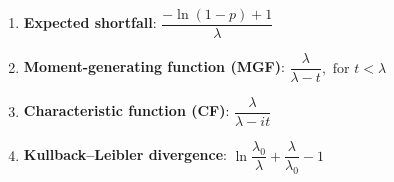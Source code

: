 \begin{enumerate}
    \item \textbf{Expected shortfall}:
    $
        {\displaystyle {\dfrac {-\ln(1-p)+1}{\lambda }}}
    $
    \hfill \cite{wiki/Exponential_distribution}

    \item \textbf{Moment-generating function (MGF)}:
    $
        {\displaystyle {\dfrac {\lambda }{\lambda -t}},{\text{ for }}t<\lambda }
    $
    \hfill \cite{wiki/Exponential_distribution}

    \item \textbf{Characteristic function (CF)}:
    $
        {\displaystyle {\dfrac {\lambda }{\lambda -it}}}
    $
    \hfill \cite{wiki/Exponential_distribution}

    \item \textbf{Kullback–Leibler divergence}:
    $
        {\displaystyle \ln {\dfrac {\lambda _{0}}{\lambda }}+{\dfrac {\lambda }{\lambda _{0}}}-1}
    $
    \hfill \cite{wiki/Exponential_distribution}
\end{enumerate}





















